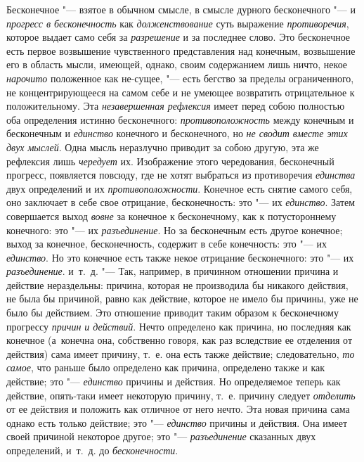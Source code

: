 
Бесконечное "--- взятое в обычном смысле, в смысле дурного бесконечного "--- и
{\em прогресс в бесконечность} как {\em долженствование} суть выражение
{\em противоречия}, которое выдает само себя за
{\em разрешение} и за последнее слово. Это бесконечное
есть первое возвышение чувственного представления над конечным, возвышение
его в область мысли, имеющей, однако, своим содержанием лишь ничто, некое
{\em нарочито} положенное как не-сущее, "--- есть бегство
за пределы ограниченного, не концентрирующееся на самом себе и не умеющее
возвратить отрицательное к положительному. Эта
{\em незавершенная рефлексия} имеет перед собою
полностью оба определения истинно бесконечного:
{\em противоположность} между конечным и бесконечным и
{\em единство} конечного и бесконечного, но
{\em не сводит вместе этих двух мыслей}. Одна мысль
неразлучно приводит за собою другую, эта же рефлексия лишь
{\em чередует} их. Изображение этого чередования,
бесконечный прогресс, появляется повсюду, где не хотят выбраться из
противоречия {\em единства} двух определений и их
{\em противоположности}. Конечное есть снятие самого
себя, оно заключает в себе свое отрицание, бесконечность: это "--- их
{\em единство}. Затем совершается выход
{\em вовне} за конечное к бесконечному, как к
потустороннему конечного: это "--- их {\em разъединение}.
Но за бесконечным есть другое конечное; выход за конечное, бесконечность,
содержит в себе конечность: это "--- их {\em единство}. Но
это конечное есть также некое отрицание бесконечного: это "--- их
{\em разъединение}. и~т.~д. "--- Так, например, в
причинном отношении причина и действие нераздельны: причина, которая не
производила бы никакого действия, не была бы причиной, равно как действие,
которое не имело бы причины, уже не было бы действием. Это отношение
приводит таким образом к бесконечному прогрессу
{\em причин и действий}. Нечто определено как причина,
но последняя как конечное (а~конечна она, собственно говоря, как раз
вследствие ее отделения от действия) сама имеет причину, т.~е. она есть
также действие; следовательно, {\em то самое}, что
раньше было определено как причина, определено также и как действие; это
"--- {\em единство} причины и действия. Но определяемое
теперь как действие, опять-таки имеет некоторую причину, т.~е. причину
следует {\em отделить} от ее действия и положить как
отличное от него нечто. Эта новая причина сама однако есть только действие;
это "--- {\em единство} причины и действия. Она имеет
своей причиной некоторое другое; это
"--- {\em разъединение} сказанных двух определений,
и~т.~д. до {\em бесконечности}.

